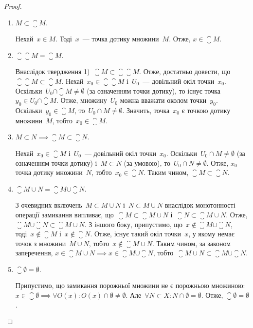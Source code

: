 \begin{proof}
    \listhack
    \begin{enumerate}
        \item $M \subset \closure M$.

        Нехай~$x \in M$. Тоді~$x$~--- точка дотику множини~$M$. Отже, $x \in \closure M$.
        
        \item $\closure{\closure{M}} = \closure M$.
        
        Внаслідок твердження 1)~$\closure M \subset \closure{\closure{M}}$. Отже, достатньо довести, що~$\closure{\closure{M}} \subset \closure M$. Нехай~$x_0 \in \closure{\closure{M}}$ і~$U_0$~--- довільний окіл точки~$x_0$. Оскільки~$U_0 \cap \closure M \ne \emptyset$ (за означенням точки дотику), то існує точка~$y_0 \in U_0 \cap \closure M$. Отже, множину~$U_0$ можна вважати околом точки~$y_0$. Оскільки~$y_0 \in \closure M$, то~$U_0 \cap M \ne \emptyset$. Значить, точка~$x_0$ є точкою дотику множини~$M$, тобто~$x_0 \in \closure M$.
        
        \item $M \subset N \implies \closure M \subset \closure N$.
        
        Нехай~$x_0 \in \closure M$ і~$U_0$~--- довільний окіл точки~$x_0$. Оскільки~$U_0 \cap M \ne \emptyset$ (за означенням точки дотику) і~$M \subset N$ (за умовою), то~$U_0 \cap N \ne \emptyset$. Отже, $x_0$~--- точка дотику множини~$N$, тобто~$x_0 \in \closure N$. Таким чином, $\closure M \subset \closure N$.
        
        \item $\closure{M \cup N} = \closure M \cup \closure N$.
        
        З очевидних включень~$M \subset M \cup N$ і~$N \subset M \cup N$ внаслідок монотонності операції замикання випливає, що~$\closure M \subset \closure{M \cup N}$ і~$\closure N \subset \closure{M \cup N}$. Отже, $\closure M \cup \closure N \subset \closure{M \cup N}$. З іншого боку, припустимо, що~$x \not\in \closure M \cup \closure N$, тоді~$x \not\in \closure M$ і~$x \not\in \closure N$. Отже, існує такий окіл точки~$x$, у якому немає точок з множини~$M \cup N$, тобто~$x \not\in \closure{M \cup N}$. Таким чином, за законом заперечення, $x \in \closure{M \cup N} \implies x \in \closure M \cup \closure N$, тобто~$\closure{M \cup N} \subset \closure M \cup \closure N$.
        
        \item $\closure \emptyset = \emptyset$.
        
        Припустимо, що замикання порожньої множини не є порожньою множиною: $x \in \closure \emptyset \implies \forall O(x): O(x) \cap \emptyset \ne \emptyset$. Але~$\forall N \subset X: N \cap \emptyset = \emptyset$. Отже, $\closure \emptyset = \emptyset$. \qedhere
    \end{enumerate}
\end{proof}

